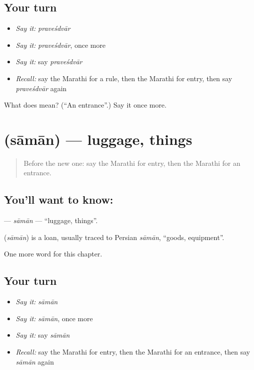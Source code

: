 \subsection*{Your turn}
\begin{itemize}
\raggedright
  \item \emph{Say it:} \emph{praveśdvār}
  \item \emph{Say it:} \emph{praveśdvār}, once more
  \item \emph{Say it:} say \emph{praveśdvār}
  \item \emph{Recall:} say the Marathi for a rule, then the Marathi for entry, then say \emph{praveśdvār} again
\end{itemize}

\begin{tcolorbox}[breakable,colback=teal!4,colframe=teal!35!black,title={Before you move on}]
What does  mean? (\textquotedblleft{}An entrance\textquotedblright{}.) Say it once more.
\end{tcolorbox}
\section[\texorpdfstring{\mr{सामान} (sāmān)}{सामान (sāmān)}]{ (sāmān) — luggage, things}

\label{lesson:MR-C240-saman}



\begin{quote}
Before the new one: say the Marathi for entry, then the Marathi for an entrance.
\end{quote}

\subsection*{You'll want to know: }
\textbf{} — \emph{sāmān} — \textquotedblleft{}luggage, things\textquotedblright{}.

\begin{cousinweb}
\textbf{} (\emph{sāmān}) is a loan, usually traced to Persian \emph{sāmān}, \textquotedblleft{}goods, equipment\textquotedblright{}.
\end{cousinweb}

\begin{grammarlens}[title={What you've built}]
One more word for this chapter.
\end{grammarlens}

\subsection*{Your turn}
\begin{itemize}
\raggedright
  \item \emph{Say it:} \emph{sāmān}
  \item \emph{Say it:} \emph{sāmān}, once more
  \item \emph{Say it:} say \emph{sāmān}
  \item \emph{Recall:} say the Marathi for entry, then the Marathi for an entrance, then say \emph{sāmān} again
\end{itemize}

